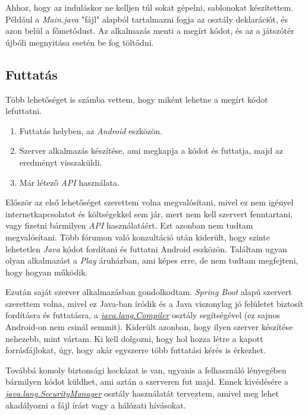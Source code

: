 \documentclass[12pt,a4paper]{article}
\begin{document}
	Ahhoz, hogy az induláskor ne kelljen túl sokat gépelni, sablonokat készítettem. Például a \textit{Main.java} "fájl" alapból tartalmazni fogja az osztály deklarációt, és azon belül a főmetódust. Az alkalmazás menti a megírt kódot, és az a játszótér újbóli megnyitása esetén be fog töltődni. 

	\subsection{Futtatás}
	
	Több lehetőséget is számba vettem, hogy miként lehetne a megírt kódot lefuttatni.
	
	\begin{enumerate}
		\item Futtatás helyben, az \textit{Android} eszközön.
		\item Szerver alkalmazás készítése, ami megkapja a kódot és futtatja, majd az eredményt visszaküldi.
		\item Már létező \textit{API} használata.
	\end{enumerate}

	Először az első lehetőséget szerettem volna megvalósítani, mivel ez nem igényel internetkapcsolatot és költségekkel sem jár, mert nem kell szervert fenntartani, vagy fizetni bármilyen \textit{API} használatáért. Ezt azonban nem tudtam megvalósítani. Több fórumon való konzultáció után kiderült, hogy szinte lehetetlen \textit{Java} kódot fordítani és futtatni Android eszközön. Találtam ugyan olyan alkalmazást a \textit{Play} áruházban, ami képes erre, de nem tudtam megfejteni, hogy hogyan működik.
	
	Ezután saját szerver alkalmazásban gondolkodtam. \textit{Spring Boot} alapú szervert szerettem volna, mivel ez Java-ban íródik és a Java viszonylag jó felületet biztosít fordításra és futtatásra, a \href{https://docs.oracle.com/javase/7/docs/api/java/lang/Compiler.html}{\textit{java.lang.Compiler}} osztály segítségével (ez sajnos Android-on nem csinál semmit). Kiderült azonban, hogy ilyen szerver készítése nehezebb, mint vártam. Ki kell dolgozni, hogy hol hozza létre a kapott forrásfájlokat, úgy, hogy akár egyszerre több futtatási kérés is érkezhet. 
	
	Továbbá komoly biztonsági kockázat is van, ugyanis a felhasználó lényegében bármilyen kódot küldhet, ami aztán a szerveren fut majd. Ennek kivédésére a \href{https://docs.oracle.com/javase/8/docs/api/java/lang/SecurityManager.html}{\textit{java.lang.SecurityManager}} osztály használatát terveztem, amivel meg lehet akadályozni a fájl írást vagy a hálózati hívásokat.
	
\end{document}
